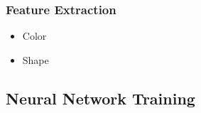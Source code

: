 \documentclass[]{beamer}
\begin{document}

    \begin{frame}
        \frametitle{Feature Extraction}

        \begin{itemize}
            \item Color
            \item Shape
        \end{itemize}
    \end{frame}

    \subsection{Neural Network Training}
\end{document}

